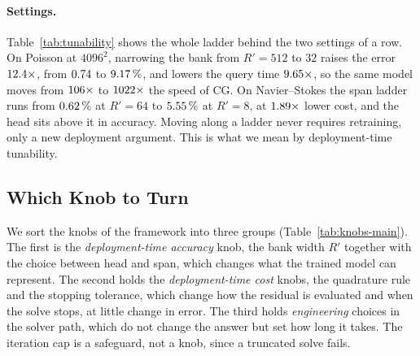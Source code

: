 \documentclass{article}
\begin{document}
\begin{table}[t]
\centering
\caption{Bank-width tunability at the finest mesh. Each block is one frozen
model, and within a cohort every speedup divides the median time of
\emph{one} full-order setting (the \emph{FOM} row, the fastest at least
as accurate as the block's most accurate setting, in the same allocation)
by the setting's time (ms). Error is the worst same-grid relative $L^2$ error (\%), over
evolved times for Navier--Stokes, Burgers and heat. Held-out cases were
never used for selection and share the development settings.
}
\label{tab:tunability}

\end{table}

\paragraph{Settings.}\label{sec:results:best}
Table~\ref{tab:tunability} shows the whole ladder behind the two settings
of a row. On Poisson at $4096^2$, narrowing the bank from $R'=512$ to $32$
raises the error $12.4\times$, from $0.74$ to
$9.17\,\%$, and lowers the query time $9.65\times$,
so the same model moves from $106\times$ to $1022\times$
the speed of CG. On Navier--Stokes the span ladder runs from
$0.62\,\%$ at $R'=64$ to $5.55\,\%$ at $R'=8$, at
$1.89\times$ lower cost, and the head sits above it in
accuracy. Moving along a ladder never requires retraining, only a new
deployment argument. This is what we mean by deployment-time tunability.

\subsection{Which Knob to Turn}\label{sec:results:tunability}

We sort the knobs of the framework into three groups
(Table~\ref{tab:knobs-main}). The first is the \emph{deployment-time
accuracy} knob, the bank width $R'$ together with the choice between head
and span, which changes what the trained model can represent. The second
holds the \emph{deployment-time cost} knobs, the quadrature rule and the
stopping tolerance, which change how the residual is evaluated and when
the solve stops, at little change in error. The third holds
\emph{engineering} choices in the solver path, which do not change the
answer but set how long it takes. The iteration cap is a safeguard, not a
knob, since a truncated solve fails.
\end{document}
